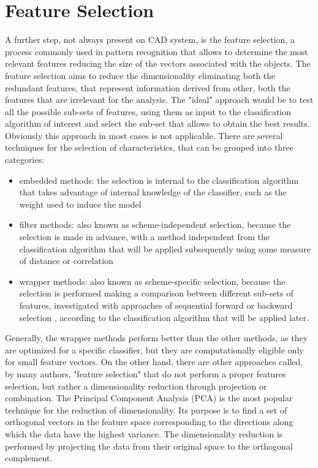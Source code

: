 \documentclass[final,a4paper,12pt,english]{UnicaPhdThesis3}
\begin{document}
\section{Feature Selection} \label{FS}
A further step, not always present on CAD system, is the feature selection, a process commonly used in pattern recognition that allows to determine the most relevant features reducing the size of the vectors associated with the objects. The feature selection aims to reduce the dimensionality eliminating both the redundant features, that represent information derived from other, both the features that are irrelevant for
the analysis. The "ideal" approach would be to test all the possible sub-sets of features, using them as input to the classification algorithm of interest and select the sub-set that allows to obtain the best results. Obviously this approach in most cases is not applicable. There are several techniques for the selection of characteristics, that can be grouped into three categories:
\begin{itemize}
\item embedded methods: the selection is internal to the classification algorithm that takes advantage of internal knowledge of the classifier, such as the weight used to induce the model \cite{Duda}
\item filter methods: also known as scheme-independent selection, because the selection is made in advance, with a method independent from the classification algorithm that will be applied subsequently using some measure of distance or correlation \cite{Yu}
\item wrapper methods: also known as scheme-specific selection, because the selection is performed making a comparison between different sub-sets of features, investigated with approaches of sequential forward or backward selection \cite{Kittler}, according to the classification algorithm that will be applied later.
\end{itemize}
Generally, the wrapper methods perform better than the other methods, as they are optimized for a specific classifier, but they are computationally eligible only for small feature vectors. On the other hand, there are other approaches called, by many authors, "feature selection" that do not perform a proper features selection, but rather a dimensionality reduction through projection or combination. The Principal Component Analysis (\acs{PCA}) \cite{Wold} is the most popular technique for the reduction of dimensionality. Its purpose is to find a set of orthogonal vectors in the feature space corresponding to the directions along which the data have the highest variance. The dimensionality reduction is performed by projecting the data from their original space to the orthogonal complement. 
\end{document}
